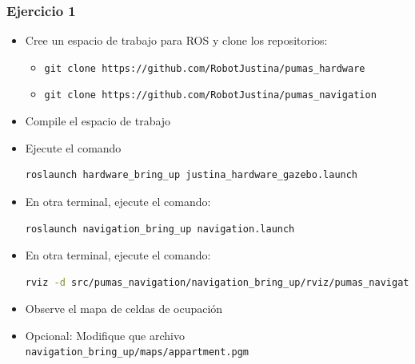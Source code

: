\begin{frame}[containsverbatim]\frametitle{Ejercicio 1}
  \begin{itemize}
  \item Cree un espacio de trabajo para ROS y clone los repositorios:
    \begin{itemize}
    \item \texttt{git clone https://github.com/RobotJustina/pumas\_hardware}
    \item \texttt{git clone https://github.com/RobotJustina/pumas\_navigation}
    \end{itemize}
  \item Compile el espacio de trabajo
  \item Ejecute el comando
    \begin{lstlisting}[language=bash]
      roslaunch hardware_bring_up justina_hardware_gazebo.launch
    \end{lstlisting}
  \item En otra terminal, ejecute el comando:
    \begin{lstlisting}[language=bash]
      roslaunch navigation_bring_up navigation.launch
    \end{lstlisting}
  \item En otra terminal, ejecute el comando:
    \begin{lstlisting}[language=bash]
    rviz -d src/pumas_navigation/navigation_bring_up/rviz/pumas_navigation.rviz
    \end{lstlisting}
  \item Observe el mapa de celdas de ocupación
  \item Opcional: Modifique que archivo \texttt{navigation\_bring\_up/maps/appartment.pgm}
  \end{itemize}
\end{frame}

